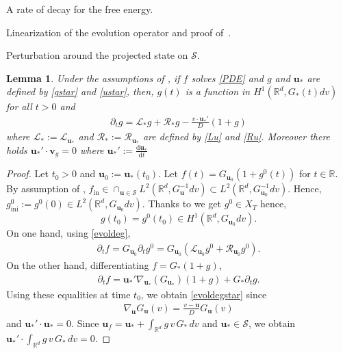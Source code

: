 \documentclass[reqno]{amsart} %
\newtheorem{lemma}{Lemma}[section]
\begin{document}
\begin{section}{A rate of decay for the free energy.}
\begin{section}{Linearization of the evolution operator and proof of~\texorpdfstring{}{thm3}.}
\begin{subsection}{Perturbation around the projected state on \texorpdfstring{$\mathcal{S}$}{S}.}
   \begin{lemma}
 \label{lemmestar}
    Under the assumptions of , if $f$ solves \eqref{PDE} and $g$ and $\mathbf{u}_*$ are defined by \eqref{gstar} and \eqref{ustar}, then, $g(t)$  is a function in $H^1(\mathbb{R}^d,G_{*}(t)dv)$ for all $t>0$ and
     \begin{align}
     \label{evoldegstar}
         \partial_tg=\mathcal{L}_{*}g+\mathcal{R}_{*}g-\frac{v\cdot \mathbf{u}_*'}{D}(1+g)
     \end{align}
      where $\mathcal{L}_*:=\mathcal{L}_{\mathbf{u}_*}$ and $\mathcal{R}_*:=\mathcal{R}_{\mathbf{u}_*}$ are defined by \eqref{Lu} and \eqref{Ru}. Moreover there holds  $\mathbf{u}_*'\cdot \mathbf{v}_g=0$ where $\mathbf{u}_*':= \frac{\mathrm{d} \mathbf{u}_*}{\mathrm{d}t}$
 \end{lemma}
 \begin{proof}
 Let $t_0>0$ and $\mathbf{u}_0:=\mathbf{u}_*(t_0)$. Let $f(t)=G_{\mathbf{u}_0}(1+g^0(t))$ for $t\in \mathbb{R}$. By assumption of , $f_{\mathrm{in}}\in \cap_{\mathbf{u}\in \mathcal{S}} L^2(\mathbb{R}^d,G_{\mathbf{u}}^{-1}dv)\subset L^2(\mathbb{R}^d,G_{\mathbf{u}_0}^{-1}dv)$. Hence, $g^0_{\mathrm{ini}}:=g^0(0)\in L^2(\mathbb{R}^d,G_{\mathbf{u}_0}^{}dv) .$
 Thanks to  we get $g^0 \in X_T$ hence, $$g(t_0)=g^0(t_0)\in H^1(\mathbb{R}^d,G_{\mathbf{u}_0 }dv).$$ 
 On one hand, using \eqref{evoldeg}, 
 \begin{align*}
     \partial_tf=G_{\mathbf{u}_0}\partial_tg^0=G_{\mathbf{u}_0}(\mathcal{L}_{\mathbf{u}_0}g^0+\mathcal{R}_{\mathbf{u}_0}g^0). 
 \end{align*}
 On the other hand, differentiating $f=G_{*}(1+g)$,
     \begin{align*}
         \partial_tf=\mathbf{u}_*'\nabla_{\mathbf{u}_*}(G_{\mathbf{u}_*})(1+g)+G_{*}\partial_tg.
     \end{align*}
    Using these equalities at time $t_0$, we obtain \eqref{evoldegstar} since 
    \begin{align}
     \label{nalblau}
         \nabla_{\mathbf{u}}G_{\mathbf{u}}(v)=\frac{v-\mathbf{u}}{D}G_{\mathbf{u}}(v)
     \end{align}
    and $\mathbf{u}_*'\cdot \mathbf{u}_*=0$. Since $\mathbf{u}_{f}=\mathbf{u}_*+\int_{\mathbb{R}^d}g \, v\, G_{*}\,dv$ and $\mathbf{u}_* \in \mathcal{S}$, we obtain $\mathbf{u}_*'\cdot \int_{\mathbb{R}^d}g\,v \,G_{*}\,dv=0$.
 \end{proof}
     



\end{subsection}
\end{section}
\end{section}
\end{document}
